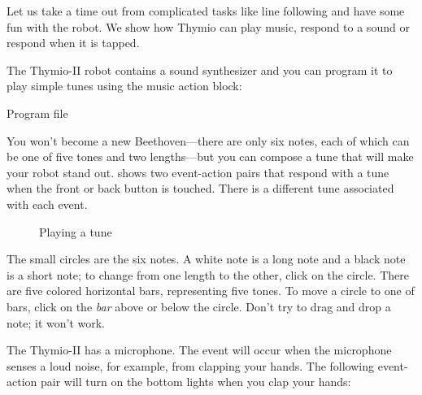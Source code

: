 \label{ch.bells}

Let us take a time out from complicated tasks like line following and
have some fun with the robot.
We show how Thymio can play music, respond to a sound or respond when it is tapped.


The Thymio-II robot contains a sound synthesizer and you can program it
to play simple tunes using the music action block: 

{\raggedleft \hfill Program file }

You won't become a new Beethoven---there are only six notes, each of
which can be one of five tones and two lengths---but you can compose a
tune that will make your robot stand out.  shows
two event-action pairs that respond with a tune when the front or back
button is touched. There is a different tune associated with each event.

\begin{figure}
\begin{center}
\caption{Playing a tune}\label{fig.music}
\end{center}
\end{figure}

The small circles are the six notes.
A white note is a long note and a black note is a short note; to change from one length to the
other, click on the circle.
There are five colored horizontal bars, representing five tones.
To move a circle to one of bars, click on the \emph{bar} above or below the circle.
Don't try to drag and drop a note; it won't work.




The Thymio-II has a microphone. The event  will occur
when the microphone senses a loud noise, for example, from clapping your
hands. The following event-action pair will turn on the bottom lights
when you clap your hands: 


